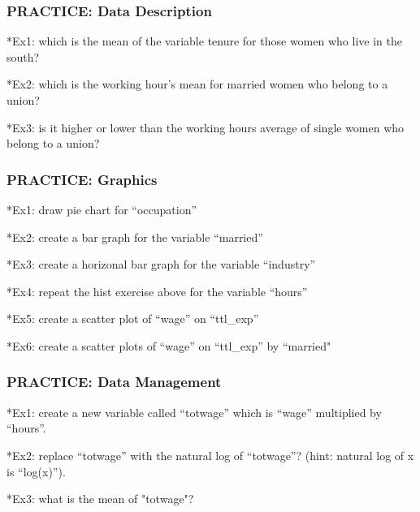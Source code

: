\documentclass[11pt, xcolor=x11names,compress]{beamer}
\begin{document}
\begin{frame}[fragile,t]
\frametitle{PRACTICE: Data Description}
*Ex1: which is the mean of the variable tenure for those women who live in the south?

\vspace{5mm}

*Ex2: which is the working hour’s mean for married women who belong to a union?

\vspace{5mm}

*Ex3: is it higher or lower than the working hours average of single women who belong to a union?

\vspace{5mm}

\end{frame}

\begin{frame}[fragile,t]
\frametitle{PRACTICE: Graphics}
*Ex1: draw pie chart for “occupation”

\vspace{5mm}

*Ex2: create a bar graph for the variable “married”

\vspace{5mm}

*Ex3: create a horizonal bar graph for the variable “industry”

\vspace{5mm}

*Ex4: repeat the hist exercise above for the variable “hours”

\vspace{5mm}

*Ex5: create a scatter plot of “wage” on “ttl\_exp”

\vspace{5mm}

*Ex6: create a scatter plots of “wage” on “ttl\_exp” by “married"

\end{frame}

\begin{frame}[fragile,t]
\frametitle{PRACTICE: Data Management}
*Ex1: create a new variable called “totwage” which is “wage” multiplied by “hours”. 

\vspace{5mm}

*Ex2: replace “totwage” with the natural log of “totwage”? (hint: natural log of x is “log(x)”).  

\vspace{5mm}

*Ex3: what is the mean of "totwage"?

\end{frame}
\end{document}
